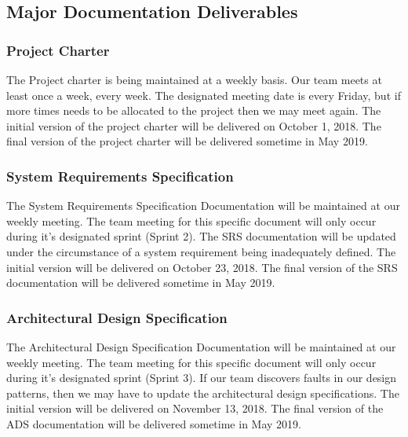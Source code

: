 
\subsection{Major Documentation Deliverables}

\subsubsection{Project Charter}
The Project charter is being maintained at a weekly basis. Our team meets at least once a week, every week. The designated meeting date is every Friday, but if more times needs to be allocated to the project then we may meet again. The initial version of the project charter will be delivered on October 1, 2018. The final version of the project charter will be delivered sometime in May 2019.

\subsubsection{System Requirements Specification}
The System Requirements Specification Documentation will be maintained at our weekly meeting. The team meeting for this specific document will only occur during it's designated sprint (Sprint 2). The SRS documentation will be updated under the circumstance of a system requirement being inadequately defined. The initial version will be delivered on October 23, 2018. The final version of the SRS documentation will be delivered sometime in May 2019.

\subsubsection{Architectural Design Specification}
The Architectural Design Specification Documentation will be maintained at our weekly meeting. The team meeting for this specific document will only occur during it's designated sprint (Sprint 3). If our team discovers faults in our design patterns, then we may have to update the architectural design specifications. The initial version will be delivered on November 13, 2018. The final version of the ADS documentation will be delivered sometime in May 2019.

